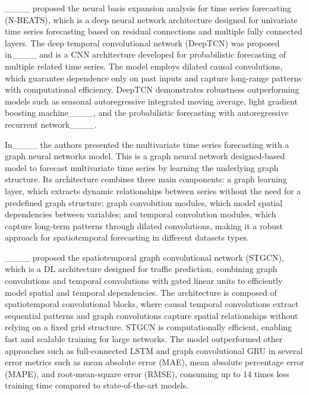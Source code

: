 ____ proposed the neural basis expansion analysis for time series forecasting (N-BEATS), which is a deep neural network architecture designed for univariate time series forecasting based on residual connections and multiple fully connected layers. The deep temporal convolutional network (DeepTCN) was proposed in____ and is a CNN architecture developed for probabilistic forecasting of multiple related time series. The model employs dilated causal convolutions, which guarantee dependence only on past inputs and capture long-range patterns with computational efficiency. DeepTCN demonstrates robustness outperforming models such as seasonal autoregressive integrated moving average, light gradient boosting machine____, and the probabilistic forecasting with autoregressive recurrent network____.

In____ the authors presented the multivariate time series forecasting with a graph neural networks model. This is a graph neural network designed-based model to forecast multivariate time series by learning the underlying graph structure. Its architecture combines three main components: a graph learning layer, which extracts dynamic relationships between series without the need for a predefined graph structure; graph convolution modules, which model spatial dependencies between variables; and temporal convolution modules, which capture long-term patterns through dilated convolutions, making it a robust approach for spatiotemporal forecasting in different datasets types.

____ proposed the spatiotemporal graph convolutional network (STGCN), which is a DL architecture designed for traffic prediction, combining graph convolutions and temporal convolutions with gated linear units to efficiently model spatial and temporal dependencies. The architecture is composed of spatiotemporal convolutional blocks, where causal temporal convolutions extract sequential patterns and graph convolutions capture spatial relationships without relying on a fixed grid structure. STGCN is computationally efficient, enabling fast and scalable training for large networks. The model outperformed other approaches such as 
full-connected LSTM and graph convolutional GRU in several error metrics such as mean absolute error (MAE), mean absolute percentage error (MAPE), and root-mean-square error (RMSE), consuming up to 14 times less training time compared to state-of-the-art models.

